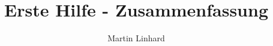 \documentclass{scrbook}
\begin{document}
\author{Martin Linhard}
\title{Erste Hilfe - Zusammenfassung}
\maketitle
\newpage
\tableofcontents
{}





\end{document}
